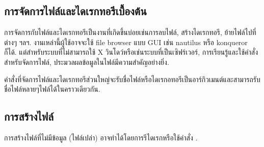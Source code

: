 \begin{thwbr}



\section{การจัดการไฟล์และไดเรกทอรีเบื้องต้น}
การจัดการกับไฟล์และไดเรกทอรีเป็นงานที่เกิดขึ้นบ่อยเช่นการลบไฟล์, สร้างไดเรกทอรี, ย้ายไฟล์ไปที่ต่างๆ ฯลฯ. งานเหล่านี้ผู้ใช้อาจจะใช้ file browser แบบ GUI เช่น nautilus หรือ konqueror ก็ได้. แต่สำหรับระบบที่ไม่สามารถใช้ X วินโดว์หรือเช่นระบบที่เป็นเซิฟร์เวอร์, การเรียนรู้และใช้คำสั่งสำหรับจัดการไฟล์, ประมวลผลข้อมูลในไฟล์มีความสำคัญอย่างยิ่ง.

คำสั่งที่จัดการไฟล์และไดเรกทอรีส่วนใหญ่จะรับชื่อไฟล์หรือไดเรกอทอรีเป็นอาร์กิวเมนต์และสามารถรับชื่อไฟล์หลายๆไฟล์ได้ในคราวเดียวกัน. 

\subsection{การสร้างไฟล์}
การสร้างไฟล์ที่ไม่มีข้อมูล (ไฟล์เปล่า) อาจทำได้โดยการรีไดเรกหรือใช้คำสั่ง .
\begin{MyExample}
\end{MyExample}%


\end{thwbr}
